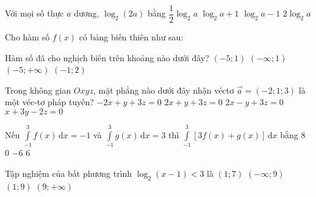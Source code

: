 \begin{ex}%
	Với mọi số thực $a$ dương, $\log _2(2a)$ bằng
	\choice 
	{$\dfrac{1}{2} \log _2 a$}
	{\True $\log _2 a+1$}
	{$\log _2 a-1$}
	{$2 \log _2 a$}
\end{ex}

\begin{ex}%
	Cho hàm số $f(x)$ có bảng biến thiên như sau:
	\begin{center}
	\end{center}
	Hàm số đã cho nghịch biến trên khoảng nào dưới đây?
	\choice 
	{$(-5 ; 1)$}
	{$(-\infty ; 1)$}
	{$(-5 ;+\infty)$}
	{\True $(-1 ; 2)$}
\end{ex}
\begin{ex}%
	Trong không gian $Oxyz$, mặt phẳng nào dưới đây nhận véctơ $\overrightarrow{a}=(-2 ; 1 ; 3)$ là một véc-tơ pháp tuyến?
	\choice 
	{\True $-2x+y+3z=0$}
	{$2x+y+3z=0$}
	{$2x-y+3z=0$}
	{$x+3y-2z=0$}
\end{ex}


\begin{ex}%
	Nếu $\displaystyle\int\limits_{-1}^{3} f(x) \mathrm{\,d}x=-1$ và $\displaystyle\int\limits_{-1}^{3} g(x) \mathrm{\,d}x=3$
	thì $\displaystyle\int\limits_{-1}^3 \left[ 3f(x)+g(x)\right] \mathrm{\,d}x$ bằng
	\choice
	{$8$}
	{\True $0$}
	{$-6$}
	{$6$}
\end{ex}

\begin{ex}%
	Tập nghiệm của bất phương trình $\log_{2}\left(x-1\right)<3$ là
	\choice
	{$\left(1;7\right)$}
	{$\left(-\infty;9\right)$}
	{\True $\left(1;9\right)$}
	{$\left(9;+\infty\right)$}
\end{ex}

